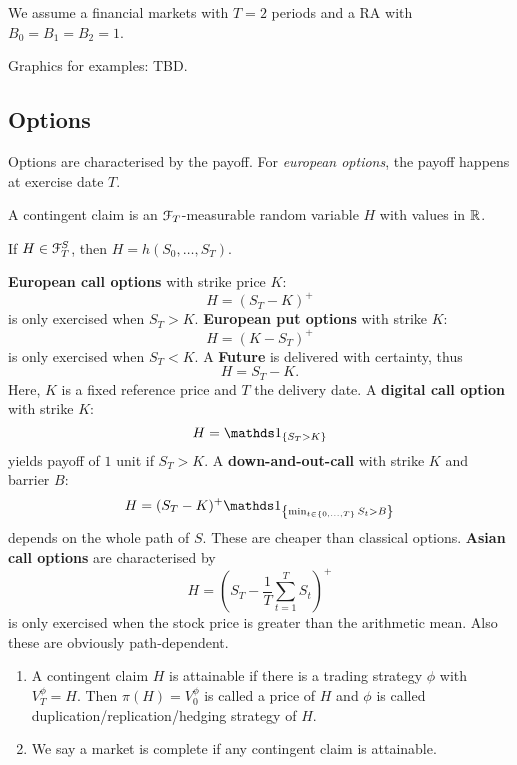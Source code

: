 \documentclass[12pt]{amsart}
\begin{document}
\begin{exercise}
    We assume a financial markets with \(T=2\) periods and a RA with \(B_0 = B_1 = B_2 = 1\).
\end{exercise}

\color{red}
Graphics for examples: TBD.
\color{black}

\subsection{Options}

Options are characterised by the payoff. For \emph{european options}, the payoff happens at exercise date \(T\).

\begin{definition}
    A contingent claim is an \(\mathcal{F}_T\)-measurable random variable \(H\) with values in \(\mathbb{R}\).
\end{definition}
\begin{remark}
    If \(H \in \mathcal{F}_T^S\), then \(H = h(S_0, \dots, S_T)\).
\end{remark}

\begin{exercise}
    \textbf{European call options} with strike price \(K\): \[
        H = (S_T-K)^+
    \]
    is only exercised when \(S_T > K\).
    \textbf{European put options} with strike \(K\): \[
        H = (K-S_T)^+
    \]
    is only exercised when \(S_T < K\). A \textbf{Future} is delivered with certainty, thus \[
        H = S_T-K.
    \]
    Here, \(K\) is a fixed reference price and \(T\) the delivery date.
    A \textbf{digital call option} with strike \(K\):
    \[
        H = \indic[S_T>K]
    \]
    yields payoff of \(1\) unit if \(S_T>K\). A \textbf{down-and-out-call} with strike \(K\) and barrier \(B\):\[
        H = (S_T-K)^+ \indic[\min_{t \in \set{0, \dots, T}} S_t > B]
    \]
    depends on the whole path of \(S\). These are cheaper than classical options. \textbf{Asian call options} are characterised by \[
        H = \left( S_T-\frac{1}{T}\sum_{t=1}^T S_t \right)^+
    \]
    is only exercised when the stock price is greater than the arithmetic mean. Also these are obviously path-dependent.
\end{exercise}

\begin{definition}
    \begin{enumerate}[label=(\alph*)]
        \item A contingent claim \(H\) is attainable if there is a trading strategy \(\phi\) with \(V_T^\phi = H\). Then \(\pi(H) = V_0^\phi\) is called a price of \(H\) and \(\phi\) is called duplication/replication/hedging strategy of \(H\).
        \item We say a market is complete if any contingent claim is attainable.
    \end{enumerate}
\end{definition}
\end{document}
